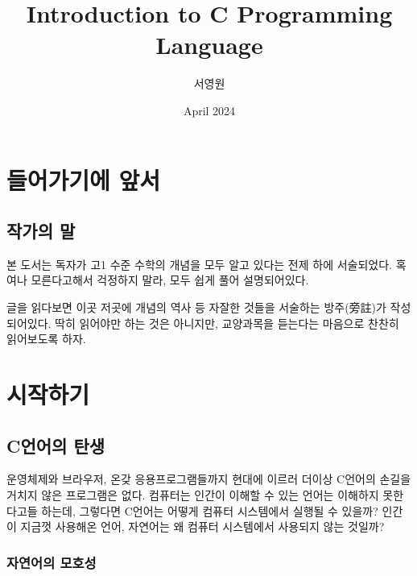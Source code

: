 \documentclass[a4paper,12pt]{book}
\title{Introduction to C Programming Language}
\author{서영원}
\date{April 2024}
\begin{document}
\linespread{1.5}

\maketitle

\tableofcontents

\vfill
\doclicenseThis


\pagebreak



\chapter{들어가기에 앞서}


\section{작가의 말}

본 도서는 독자가 고1 수준 수학의 개념을 모두 알고 있다는 전제 하에 서술되었다.
혹여나 모른다고해서 걱정하지 말라, 모두 쉽게 풀어 설명되어있다.

글을 읽다보면 이곳 저곳에 개념의 역사 등 자잘한 것들을 서술하는 방주(旁註)가 작성되어있다.
딱히 읽어야만 하는 것은 아니지만, 교양과목을 듣는다는 마음으로 찬찬히 읽어보도록 하자.


\chapter{시작하기}


\section{C언어의 탄생}

운영체제와 브라우저, 온갖 응용프로그램들까지 현대에 이르러 더이상
C언어의 손길을 거치지 않은 프로그램은 없다.
컴퓨터는 인간이 이해할 수 있는 언어는 이해하지 못한다고들 하는데,
그렇다면 C언어는 어떻게 컴퓨터 시스템에서 실행될 수 있을까?
인간이 지금껏 사용해온 언어, 자연어는 왜 컴퓨터 시스템에서 사용되지 않는
것일까?


\subsection{자연어의 모호성}
\end{document}
